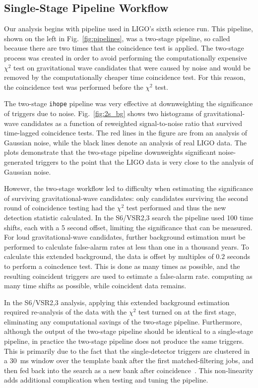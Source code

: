 \documentclass[12pt]{iopart} \usepackage{graphicx,amssymb}
\begin{document}
\subsection{Single-Stage Pipeline Workflow}
\label{s:stages}

Our analysis begins with pipeline used in LIGO's sixth science run. This
pipeline, shown on the left in Fig.~\ref{fig:pipelines}, was a two-stage
pipeline, so called because there are two times that the coincidence test is
applied.  The two-stage process was created in order to avoid performing the
computationally expensive $\chi^2$ test on gravitational wave candidates that
were caused by noise and would be removed by the computationally cheaper time
coincidence test. For this reason, the coincidence test was performed before
the $\chi^2$ test. 

The two-stage \texttt{ihope} pipeline was very effective at downweighting the 
significance of triggers due to noise.  Fig.~\ref{fig:2s_bg} shows two histograms
of gravitational-wave candidates as a function of reweighted signal-to-noise ratio that survived
time-lagged coincidence tests. The red lines in the figure are from an
analysis of Gaussian noise, while the black lines denote an analysis of real
LIGO data. The plots demonstrate that the two-stage pipeline downweights
significant noise-generated triggers to the point that the LIGO data is very
close to the analysis of Gaussian noise.

However, the two-stage workflow led to difficulty when estimating the
significance of surviving gravitational-wave candidates: only candidates
surviving the second round of coincidence testing had the $\chi^2$ test
performed and thus the new detection statistic calculated.  In the
S6/VSR2,3 search the pipeline used 100 time shifts, each with a 5 second 
offset, limiting the significance that can be measured.  For 
loud gravitational-wave candidates, further background estimation must be
performed to calculate false-alarm rates at less than one in a thousand years.
To calculate this extended background, the data is offset by multiples of $0.2$ seconds to
perform a coincdence test. This is done as many times as possible, and the
resulting coincident triggers are used to estimate a false-alarm rate. 
computing as many time shifts as possible, while coincident data remains.

In the S6/VSR2,3 analysis, applying this extended background estimation 
required re-analysis of the data with the $\chi^2$ test turned on at the 
first stage, eliminating any computational savings 
of the two-stage pipeline. Furthermore, although the output of the two-stage
pipeline should be identical to a single-stage pipeline, in practice the
two-stage pipeline does not produce the same triggers. This is primarily due
to the fact that the single-detector triggers are clustered in a 30~ms window
over the template bank after the first matched-filtering jobs, and then fed
back into the search as a new bank after coincidence~\cite{Babak:2012zx}. This
non-linearity adds additional complication when testing and tuning the
pipeline.
\end{document}
